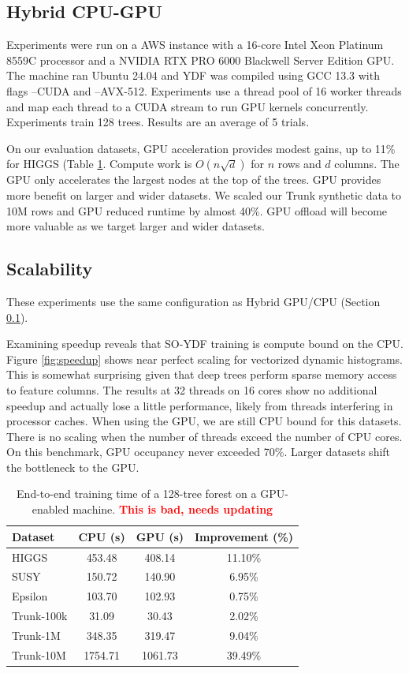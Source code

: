 \documentclass[sigconf]{acmart}
\newcommand{\TODO}[1]{\textbf{\textcolor{red}{#1}}}
\begin{document}
\subsection{Hybrid CPU-GPU}
\label{sec:hybrid}

Experiments were run on a AWS instance with a 16-core Intel Xeon Platinum 8559C processor and a NVIDIA RTX PRO 6000 Blackwell Server Edition GPU. The machine ran Ubuntu 24.04 and YDF was compiled using GCC 13.3 with flags {\sf --CUDA} and {\sf --AVX-512.} Experiments use a thread pool of 16 worker threads and map each thread to a CUDA stream to run GPU kernels concurrently. Experiments train 128 trees. Results are an average of 5 trials. 

On our evaluation datasets, GPU acceleration provides modest gains, up to 11\% for HIGGS (Table \ref{tab:gpu}. Compute work is $O(n \sqrt{d})$ for $n$ rows and $d$ columns. The GPU only accelerates the largest nodes at the top of the trees. GPU provides more benefit on larger and wider datasets. We scaled our Trunk synthetic data to 10M rows and GPU reduced runtime by almost 40\%. GPU offload will become more valuable as we target larger and wider datasets.



\subsection{Scalability}

These experiments use the same configuration as Hybrid GPU/CPU (Section \ref{sec:hybrid}).

Examining speedup reveals that SO-YDF training is compute bound on the CPU. Figure \ref{fig:speedup} shows near perfect scaling for vectorized dynamic histograms. This is somewhat surprising given that deep trees perform sparse memory access to feature columns. The results at 32 threads on 16 cores show no additional speedup and actually lose a little performance, likely from threads interfering in processor caches. When using the GPU, we are still CPU bound for this datasets. There is no scaling when the number of threads exceed the number of CPU cores. On this benchmark, GPU occupancy never exceeded 70\%. Larger datasets shift the bottleneck to the GPU.

\begin{table}[t]
\centering
\begin{tabular}{lccc}
\toprule
\textbf{Dataset} & \textbf{CPU (s)} & \textbf{GPU (s)} & \textbf{Improvement (\%)} \\
\midrule
HIGGS     & 453.48 & 408.14 & 11.10\% \\
SUSY       & 150.72 & 140.90 & 6.95\% \\
Epsilon  & 103.70 & 102.93 & 0.75\% \\
Trunk-100k  & 31.09  & 30.43  & 2.02\% \\
Trunk-1M    & 348.35 & 319.47 & 9.04\% \\
Trunk-10M    & 1754.71 & 1061.73 & 39.49\% \\
\bottomrule
\end{tabular}
\caption{End-to-end training time of a 128-tree forest on a GPU-enabled machine. \TODO{This is bad, needs updating}}
\label{tab:gpu}
\end{table}
\end{document}
